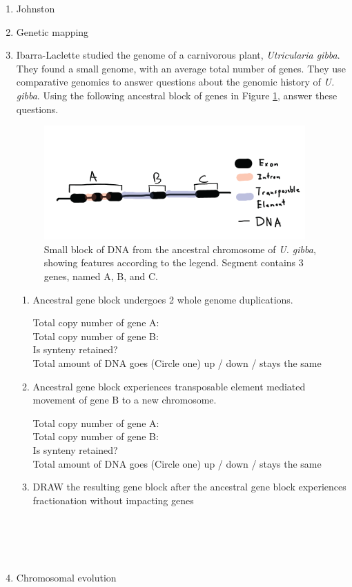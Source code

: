 \documentclass[]{article}
\begin{document}
\begin{enumerate}
\newpage

\item Johnston
\newpage
\item Genetic mapping
\newpage
\item Ibarra-Laclette studied the genome of a carnivorous plant, \emph{Utricularia gibba}.  They found a small genome, with an average total number of genes.  They use comparative genomics to answer questions about the genomic history of \emph{U. gibba}.  Using the following ancestral block of genes in Figure \ref{minute}, answer these questions.
\begin{figure}[h]
  \begin{center}
   \includegraphics[width=100mm]{images/minute_gene_block.png}
\caption{Small block of DNA from the ancestral chromosome of \emph{U. gibba}, showing features according to the legend.  Segment contains 3 genes, named A, B, and C.}
\label{minute}
  \end{center}
\end{figure}
\begin{enumerate}
\item Ancestral gene block undergoes 2 whole genome duplications.

Total copy number of gene A:\\
Total copy number of gene B:\\
Is synteny retained?\\
Total amount of DNA goes (Circle one) up / down / stays the same\\

\item Ancestral gene block experiences transposable element mediated movement of gene B to a new chromosome.

Total copy number of gene A:\\
Total copy number of gene B:\\
Is synteny retained?\\
Total amount of DNA goes (Circle one) up / down / stays the same\\

\item DRAW the resulting gene block after the ancestral gene block experiences fractionation without impacting genes
\\
\\
\\
\\
\\
\end{enumerate}


\newpage
\item Chromosomal evolution
\end{enumerate}
\end{document}
